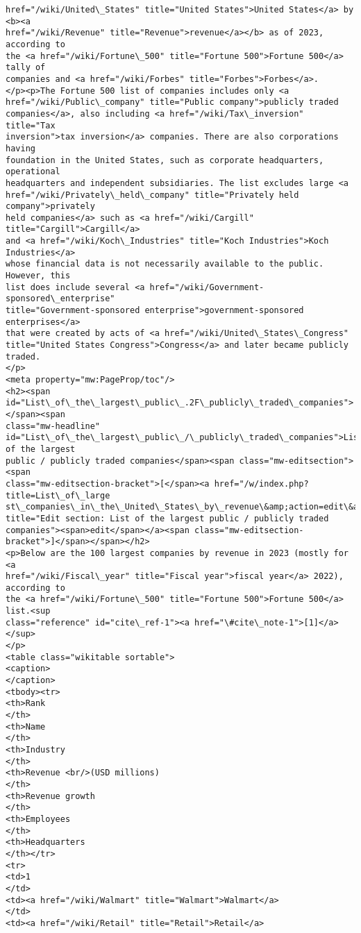 \documentclass[11pt]{article}
\begin{document}
\begin{Verbatim}[commandchars=\\\{\}]
href="/wiki/United\_States" title="United States">United States</a> by <b><a
href="/wiki/Revenue" title="Revenue">revenue</a></b> as of 2023, according to
the <a href="/wiki/Fortune\_500" title="Fortune 500">Fortune 500</a> tally of
companies and <a href="/wiki/Forbes" title="Forbes">Forbes</a>.
</p><p>The Fortune 500 list of companies includes only <a
href="/wiki/Public\_company" title="Public company">publicly traded
companies</a>, also including <a href="/wiki/Tax\_inversion" title="Tax
inversion">tax inversion</a> companies. There are also corporations having
foundation in the United States, such as corporate headquarters, operational
headquarters and independent subsidiaries. The list excludes large <a
href="/wiki/Privately\_held\_company" title="Privately held company">privately
held companies</a> such as <a href="/wiki/Cargill" title="Cargill">Cargill</a>
and <a href="/wiki/Koch\_Industries" title="Koch Industries">Koch Industries</a>
whose financial data is not necessarily available to the public. However, this
list does include several <a href="/wiki/Government-sponsored\_enterprise"
title="Government-sponsored enterprise">government-sponsored enterprises</a>
that were created by acts of <a href="/wiki/United\_States\_Congress"
title="United States Congress">Congress</a> and later became publicly traded.
</p>
<meta property="mw:PageProp/toc"/>
<h2><span
id="List\_of\_the\_largest\_public\_.2F\_publicly\_traded\_companies"></span><span
class="mw-headline"
id="List\_of\_the\_largest\_public\_/\_publicly\_traded\_companies">List of the largest
public / publicly traded companies</span><span class="mw-editsection"><span
class="mw-editsection-bracket">[</span><a href="/w/index.php?title=List\_of\_large
st\_companies\_in\_the\_United\_States\_by\_revenue\&amp;action=edit\&amp;section=1"
title="Edit section: List of the largest public / publicly traded
companies"><span>edit</span></a><span class="mw-editsection-
bracket">]</span></span></h2>
<p>Below are the 100 largest companies by revenue in 2023 (mostly for <a
href="/wiki/Fiscal\_year" title="Fiscal year">fiscal year</a> 2022), according to
the <a href="/wiki/Fortune\_500" title="Fortune 500">Fortune 500</a> list.<sup
class="reference" id="cite\_ref-1"><a href="\#cite\_note-1">[1]</a></sup>
</p>
<table class="wikitable sortable">
<caption>
</caption>
<tbody><tr>
<th>Rank
</th>
<th>Name
</th>
<th>Industry
</th>
<th>Revenue <br/>(USD millions)
</th>
<th>Revenue growth
</th>
<th>Employees
</th>
<th>Headquarters
</th></tr>
<tr>
<td>1
</td>
<td><a href="/wiki/Walmart" title="Walmart">Walmart</a>
</td>
<td><a href="/wiki/Retail" title="Retail">Retail</a>

\end{Verbatim}
\end{document}
